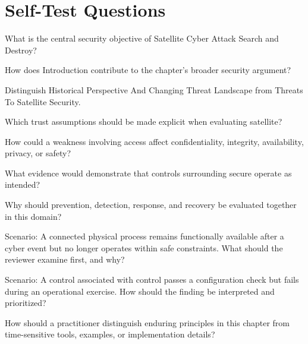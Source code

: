 \documentclass[11pt,letterpaper]{article}
\begin{document}
\section*{Self-Test Questions}
\begin{CornellRecallList}
\item What is the central security objective of Satellite Cyber Attack Search and Destroy?
\item How does Introduction contribute to the chapter's broader security argument?
\item Distinguish Historical Perspective And Changing Threat Landscape from Threats To Satellite Security.
\item Which trust assumptions should be made explicit when evaluating satellite?
\item How could a weakness involving access affect confidentiality, integrity, availability, privacy, or safety?
\item What evidence would demonstrate that controls surrounding secure operate as intended?
\item Why should prevention, detection, response, and recovery be evaluated together in this domain?
\item Scenario: A connected physical process remains functionally available after a cyber event but no longer operates within safe constraints. What should the reviewer examine first, and why?
\item Scenario: A control associated with control passes a configuration check but fails during an operational exercise. How should the finding be interpreted and prioritized?
\item How should a practitioner distinguish enduring principles in this chapter from time-sensitive tools, examples, or implementation details?
\end{CornellRecallList}
\end{document}
